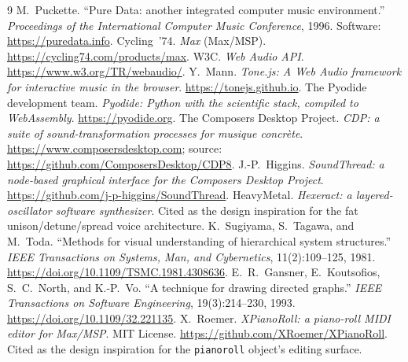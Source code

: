 \documentclass[11pt,letterpaper]{article}
\begin{document}
\begin{thebibliography}{9}
 M.~Puckette. ``Pure Data: another integrated computer music
  environment.'' \emph{Proceedings of the International Computer Music Conference}, 1996.
  Software: \url{https://puredata.info}.
 Cycling~'74. \emph{Max} (Max/MSP). \url{https://cycling74.com/products/max}.
 W3C. \emph{Web Audio API}. \url{https://www.w3.org/TR/webaudio/}.
 Y.~Mann. \emph{Tone.js: A Web Audio framework for interactive music in the
  browser}. \url{https://tonejs.github.io}.
 The Pyodide development team. \emph{Pyodide: Python with the scientific
  stack, compiled to WebAssembly}. \url{https://pyodide.org}.
 The Composers Desktop Project. \emph{CDP: a suite of sound-transformation
  processes for \emph{musique concr\`ete}}. \url{https://www.composersdesktop.com};
  source: \url{https://github.com/ComposersDesktop/CDP8}.
 J.-P.~Higgins. \emph{SoundThread: a node-based graphical interface
  for the Composers Desktop Project}. \url{https://github.com/j-p-higgins/SoundThread}.
 HeavyMetal. \emph{Hexeract: a layered-oscillator software synthesizer}.
  Cited as the design inspiration for the fat unison/detune/spread voice architecture.
 K.~Sugiyama, S.~Tagawa, and M.~Toda. ``Methods for visual understanding of
  hierarchical system structures.'' \emph{IEEE Transactions on Systems, Man, and Cybernetics},
  11(2):109--125, 1981. \url{https://doi.org/10.1109/TSMC.1981.4308636}.
 E.~R.~Gansner, E.~Koutsofios, S.~C.~North, and K.-P.~Vo. ``A technique for
  drawing directed graphs.'' \emph{IEEE Transactions on Software Engineering}, 19(3):214--230,
  1993. \url{https://doi.org/10.1109/32.221135}.
 X.~Roemer. \emph{XPianoRoll: a piano-roll MIDI editor for Max/MSP}. MIT
  License. \url{https://github.com/XRoemer/XPianoRoll}. Cited as the design inspiration for the
  \texttt{pianoroll} object's editing surface.
\end{thebibliography}
\end{document}
